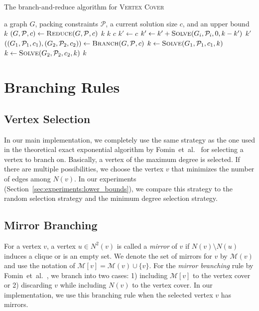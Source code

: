 \documentclass[11pt]{article}
\begin{document}
{
\begin{algorithm}[tb]
\caption{The branch-and-reduce algorithm for \textsc{Vertex Cover}}
\label{alg:overview}
\begin{algorithmic}[1]
\INPUT a graph $G$, packing constraints $\mathcal{P}$, a current solution size $c$, and an upper
bound $k$
\State $(G,\mathcal{P},c)\leftarrow\Call{Reduce}{G,\mathcal{P},c}$
	\Return $k$
\EndIf
{}
	\Return $k$
\EndIf
{}
	\Return $c$
\EndIf
{}
	\State $k'\leftarrow c$
		\State $k'\leftarrow k'+\Call{Solve}{G_i,\mathcal{P}_i,0,k-k'}$
	\EndFor
	\State \Return $k'$
\EndIf
\State $((G_1,\mathcal{P}_1,c_1),(G_2,\mathcal{P}_2,c_2))\leftarrow\Call{Branch}{G,\mathcal{P},c}$
\State $k\leftarrow\Call{Solve}{G_1,\mathcal{P}_1,c_1,k}$
\State $k\leftarrow\Call{Solve}{G_2,\mathcal{P}_2,c_2,k}$
\State \Return $k$
\EndProcedure
\end{algorithmic}
\end{algorithm}
}
 \section{Branching Rules}\label{sec:branching}

\subsection{Vertex Selection}
In our main implementation, we completely use the same strategy as the one used in the theoretical exact exponential
algorithm by Fomin~et~al.~\cite{vc_reduction/measure_and_conquer} for selecting a vertex to branch on.
Basically, a vertex of the maximum degree is selected.
If there are multiple possibilities, we choose the vertex $v$ that minimizes the number of edges among $N(v)$.
In our experiments (Section~\ref{sec:experiments:lower_bounds}), we compare this strategy to the random selection strategy and the
minimum degree selection strategy.

\subsection{Mirror Branching}\label{sec:branching:mirror}
For a vertex $v$, a vertex $u\in N^2(v)$ is called a \emph{mirror} of $v$ if $N(v)\setminus N(u)$ induces a clique or
is an empty set.
We denote the set of mirrors for $v$ by $\mathcal{M}(v)$ and use the notation of $\mathcal{M}[v]=\mathcal{M}(v)\cup\{v\}$.
For the \emph{mirror branching} rule by Fomin~et~al.~\cite{vc_reduction/measure_and_conquer},
we branch into two cases: 1) including $\mathcal{M}[v]$ to the vertex cover or 2) discarding $v$ while including $N(v)$ to the
vertex cover.
In our implementation, we use this branching rule when the selected vertex $v$ has mirrors.
\end{document}
